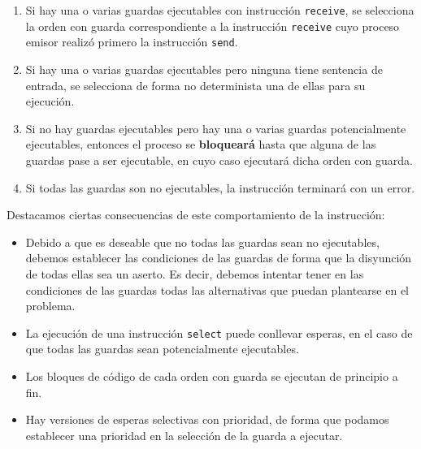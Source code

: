 \begin{enumerate}
    \item Si hay una o varias guardas ejecutables con instrucción \verb|receive|, se selecciona la orden con guarda correspondiente a la instrucción \verb|receive| cuyo proceso emisor realizó primero la instrucción \verb|send|.
    \item Si hay una o varias guardas ejecutables pero ninguna tiene sentencia de entrada, se selecciona de forma no determinista una de ellas para su ejecución.
    \item Si no hay guardas ejecutables pero hay una o varias guardas potencialmente ejecutables, entonces el proceso se \textbf{bloqueará} hasta que alguna de las guardas pase a ser ejecutable, en cuyo caso ejecutará dicha orden con guarda.
    \item Si todas las guardas son no ejecutables, la instrucción terminará con un error.
\end{enumerate}
Destacamos ciertas consecuencias de este comportamiento de la instrucción:
\begin{itemize}
    \item Debido a que es deseable que no todas las guardas sean no ejecutables, debemos establecer las condiciones de las guardas de forma que la disyunción de todas ellas sea un aserto. Es decir, debemos intentar tener en las condiciones de las guardas todas las alternativas que puedan plantearse en el problema.
    \item La ejecución de una instrucción \verb|select| puede conllevar esperas, en el caso de que todas las guardas sean potencialmente ejecutables.
    \item Los bloques de código de cada orden con guarda se ejecutan de principio a fin.
    \item Hay versiones de esperas selectivas con prioridad, de forma que podamos establecer una prioridad en la selección de la guarda a ejecutar.
\end{itemize}

